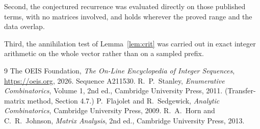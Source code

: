 \documentclass[11pt,a4paper]{article}
\theoremstyle{plain}
\theoremstyle{definition}
\begin{document}
Second, the conjectured recurrence was evaluated directly on those published terms, with no
matrices involved, and holds wherever the proved range and the data overlap.

Third, the annihilation test of Lemma~\ref{lem:crit} was carried out in exact integer
arithmetic on the whole vector rather than on a sampled prefix.

\begin{thebibliography}{9}
 The OEIS Foundation, \emph{The On-Line Encyclopedia of Integer
Sequences}, \url{https://oeis.org}, 2026. Sequence A211530.
 R.~P.~Stanley, \emph{Enumerative Combinatorics}, Volume 1, 2nd ed.,
Cambridge University Press, 2011. (Transfer-matrix method, Section 4.7.)
 P.~Flajolet and R.~Sedgewick, \emph{Analytic Combinatorics}, Cambridge
University Press, 2009.
 R.~A.~Horn and C.~R.~Johnson, \emph{Matrix Analysis}, 2nd ed., Cambridge
University Press, 2013.
\end{thebibliography}
\end{document}
